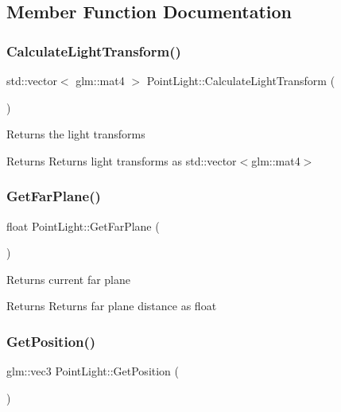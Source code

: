 \subsection{Member Function Documentation}
\mbox{\label{class_point_light_ad8abf7541c6b7113bb5aa324272f9900}} 
\subsubsection{\texorpdfstring{CalculateLightTransform()}{CalculateLightTransform()}}
{\footnotesize\ttfamily std\+::vector$<$ glm\+::mat4 $>$ Point\+Light\+::\+Calculate\+Light\+Transform (\begin{DoxyParamCaption}{ }\end{DoxyParamCaption})}

Returns the light transforms \begin{DoxyReturn}{Returns}
Returns light transforms as std\+::vector$<$glm\+::mat4$>$ 
\end{DoxyReturn}
\mbox{\label{class_point_light_aed9b70818ab7ddfe9c94ca895233f1de}} 
\subsubsection{\texorpdfstring{GetFarPlane()}{GetFarPlane()}}
{\footnotesize\ttfamily float Point\+Light\+::\+Get\+Far\+Plane (\begin{DoxyParamCaption}{ }\end{DoxyParamCaption})}

Returns current far plane \begin{DoxyReturn}{Returns}
Returns far plane distance as float 
\end{DoxyReturn}
\mbox{\label{class_point_light_aa0325f850903c1e8e6aacbb870d9d1a0}} 
\subsubsection{\texorpdfstring{GetPosition()}{GetPosition()}}
{\footnotesize\ttfamily glm\+::vec3 Point\+Light\+::\+Get\+Position (\begin{DoxyParamCaption}{ }\end{DoxyParamCaption})}


